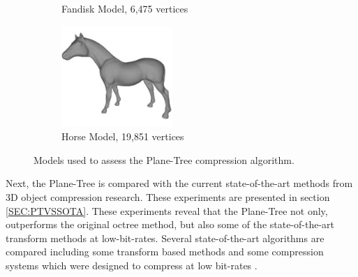 \begin{figure}[t]
\begin{center}
\begin{subfigure}[b]{4.4cm}
                \captionsetup{justification=centering}
                \caption{Fandisk Model, 6,475 vertices}
                \label{fig:MODELSUSEDA_FANDISK}
        \end{subfigure}%
        \begin{subfigure}[b]{4.4cm}
                \includegraphics[width=4.2cm]{images/experiments/test_data/models_used/horse_19851}
                \captionsetup{justification=centering}
                \caption{Horse Model, 19,851 vertices}
                \label{fig:MODELSUSEDA_HORSE}
        \end{subfigure}
       \caption{Models used to assess the Plane-Tree compression algorithm.}
       \label{fig:MODELSUSEDA}
       \end{center}
\end{figure}



Next, the Plane-Tree is compared with the current state-of-the-art methods from 3D object compression research. These experiments are presented in section \ref{SEC:PTVSSOTA}. These experiments reveal that the Plane-Tree not only, outperforms the original octree method, but also some of the state-of-the-art transform methods at low-bit-rates. Several state-of-the-art algorithms are compared including some transform based methods \cite{Bayazit103DMesh,Khodakovsky00Progressive} and some compression systems which were designed to compress at low bit-rates \cite{Peng10Feature,Lincoln13Hons}. \\ 

